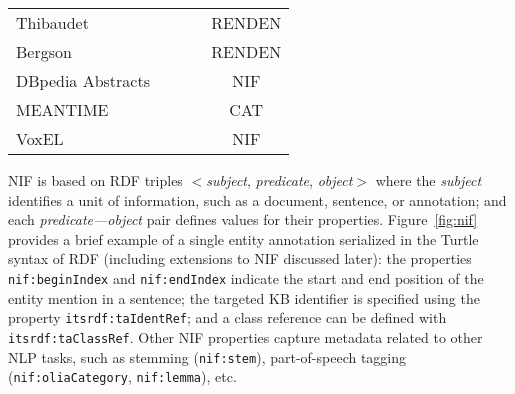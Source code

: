 \documentclass[sigconf]{acmart}
\newcommand{\cmark}{\ding{51}}%
\newcommand{\xmark}{\ding{55}}%
\begin{document}
\begin{table}[tb!]
\begin{tabular}{lccc}
Thibaudet~\cite{renden2016}         &\xmark &\cmark & RENDEN  \\ %
Bergson~\cite{renden2016}           &\xmark &\cmark & RENDEN  \\ %
DBpedia Abstracts
~\cite{abstracts2016}               &\xmark &\xmark & NIF \\ %
MEANTIME~\cite{meantime2016}        &\cmark &\cmark & CAT \\ %
VoxEL~\cite{VoxEL2018}              &\cmark &\xmark & NIF \\%
\bottomrule
\end{tabular}
\end{table}

NIF is based on RDF triples $<$\textit{subject}, \textit{predicate}, \textit{object}$>$ where the \textit{subject} identifies a unit of information, such as a document, sentence, or annotation; and each \textit{predicate---object} pair defines values for their properties. Figure~\ref{fig:nif} provides a brief example of a single entity annotation serialized in the Turtle syntax of RDF (including extensions to NIF discussed later): the properties \texttt{nif:beginIndex} and \texttt{nif:endIndex} indicate the start and end position of the entity mention in a sentence; the targeted KB identifier is specified using the property \texttt{itsrdf:taIdentRef}; and a class reference can be defined with \texttt{itsrdf:taClassRef}. Other NIF properties capture metadata related to other NLP tasks, such as stemming (\texttt{nif:stem}), part-of-speech tagging (\texttt{nif:oliaCategory}, \texttt{nif:lemma}), etc.








\end{document}
